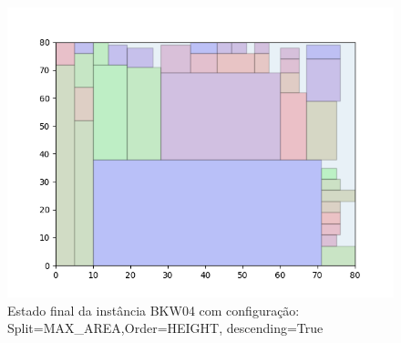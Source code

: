 \begin{figure}[H]
    \centering
    \caption[]{Estado final da instância BKW04 com configuração: Split=MAX_AREA,Order=HEIGHT, descending=True}
    \label{fig:bkw04-max_area-height-true}
    \includegraphics[scale=0.5]{output/figures/bkw/bkw04/max_area/height/true/00}
\end{figure}